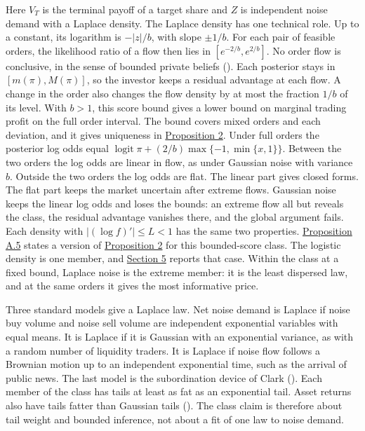
Here \(V_T\) is the terminal payoff of a target share and \(Z\) is
independent noise demand with a Laplace density. The Laplace density
has one technical role. Up to a constant, its logarithm is
\(-|z|/b\), with slope \(\pm 1/b\). For each pair of feasible orders,
the likelihood ratio of a flow then lies in \([e^{-2/b},e^{2/b}]\).
No order flow is conclusive, in the sense of bounded private beliefs
(). Each
posterior stays in \([m(\pi),M(\pi)]\), so the investor keeps a
residual advantage at each flow. A change in the order also changes
the flow density by at most the fraction \(1/b\) of its level. With
\(b>1\), this score bound gives a lower bound on marginal trading
profit on the full order interval. The bound covers mixed orders and
each deviation, and it gives uniqueness in
\hyperref[result-proposition-2]{Proposition 2}. Under full orders the
posterior log odds equal
\(\operatorname{logit}\pi+(2/b)\max\{-1,\min\{x,1\}\}\). Between the
two orders the log odds are linear in flow, as under Gaussian noise
with variance \(b\). Outside the two orders the log odds are flat.
The linear part gives closed forms. The flat part keeps the market
uncertain after extreme flows. Gaussian noise keeps the linear log
odds and loses the bounds: an extreme flow all but reveals the class,
the residual advantage vanishes there, and the global argument fails.
Each density with \(|(\log f)'|\le L<1\) has the same two properties.
\hyperref[result-proposition-a-5]{Proposition A.5} states a version of
\hyperref[result-proposition-2]{Proposition 2} for this bounded-score
class. The logistic density is one member, and
\hyperref[sec-extensions]{Section 5} reports that case. Within the
class at a fixed bound, Laplace noise is the extreme member: it is
the least dispersed law, and at the same orders it gives the most
informative price.

Three standard models give a Laplace law. Net noise demand is Laplace
if noise buy volume and noise sell volume are independent exponential
variables with equal means. It is Laplace if it is Gaussian with an
exponential variance, as with a random number of liquidity traders.
It is Laplace if noise flow follows a Brownian motion up to an
independent exponential time, such as the arrival of public news.
The last model is the subordination device of Clark
(). Each member of the class has
tails at least as fat as an exponential tail. Asset returns also have
tails fatter than Gaussian tails
(). The class claim is therefore
about tail weight and bounded inference, not about a fit of one law
to noise demand.
